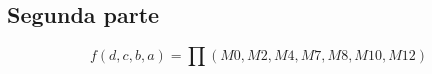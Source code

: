 \subsection{Segunda parte}

\begin{displaymath}
f(d,c,b,a) = \prod{(M0,M2,M4,M7,M8,M10,M12)}
\end{displaymath}
